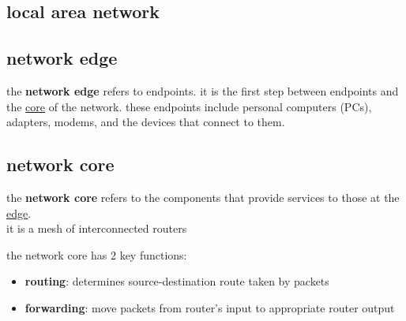 \documentclass[a4paper,12pt]{article}
\begin{document}
\subsection{local area network}
\label{sec:org455686e}
\subsection{network edge}
\label{sec:orgaf3ce0c}
\begin{definition}
the \textbf{network edge} refers to endpoints. it is the first step between endpoints and the \hyperref[sec:org1270f5f]{core} of the network. these endpoints include personal computers (PCs), adapters, modems, and the devices that connect to them.\\
\end{definition}
\subsection{network core}
\label{sec:org1270f5f}
\begin{definition}
the \textbf{network core} refers to the components that provide services to those at the \hyperref[sec:orgaf3ce0c]{edge}.\\
it is a mesh of interconnected routers\\

\begin{characteristic}
the network core has 2 key functions:\\
\begin{itemize}
\item \textbf{routing}: determines source-destination route taken by packets\\
\item \textbf{forwarding}: move packets from router's input to appropriate router output\\
\end{itemize}
\end{characteristic}
\end{definition}
\end{document}
